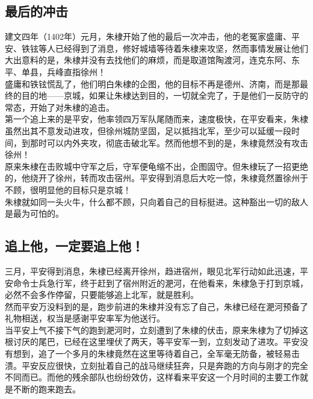 \begin{multicols}{\theparacolNo}
\subsection{最后的冲击}
建文四年（1402年）元月，朱棣开始了他的最后一次冲击，他的老冤家盛庸、平安、铁铉等人已经得到了消息，修好城墙等待着朱棣来攻坚，然而事情发展让他们大出意料的是，朱棣并没有去找他们的麻烦，而是取道馆陶渡河，连克东阿、东平、单县，兵峰直指徐州！\\

盛庸和铁铉慌乱了，他们明白朱棣的企图，他的目标不再是德州、济南，而是那最终的目的地——京城，如果让朱棣达到目的，一切就全完了，于是他们一反防守的常态，开始了对朱棣的追击。\\

第一个追上来的是平安，他率领四万军队尾随而来，速度极快，在平安看来，朱棣虽然出其不意发动进攻，但徐州城防坚固，足以抵挡北军，至少可以延缓一段时间，到那时可以内外夹攻，彻底击破北军。然而他想不到的是，朱棣竟然没有攻击徐州！\\

原来朱棣在击败城中守军之后，守军便龟缩不出，企图固守。但朱棣玩了一招更绝的，他绕开了徐州，转而攻击宿州。平安得到消息后大吃一惊，朱棣竟然置徐州于不顾，很明显他的目标只是京城！\\

朱棣就如同一头火牛，什么都不顾，只向着自己的目标挺进。这种豁出一切的敌人是最为可怕的。\\

\subsection{追上他，一定要追上他！}
三月，平安得到消息，朱棣已经离开徐州，趋进宿州，眼见北军行动如此迅速，平安命令士兵急行军，终于赶到了宿州附近的淝河，在他看来，朱棣急于打到京城，必然不会多作停留，只要能够追上北军，就是胜利。\\

然而平安万没料到的是，跑步前进的朱棣并没有忘了自己，朱棣已经在淝河预备了礼物相送，权当是感谢平安率军为他送行。\\

当平安上气不接下气的跑到淝河时，立刻遭到了朱棣的伏击，原来朱棣为了切掉这根讨厌的尾巴，已经在这里埋伏了两天，等平安军一到，立刻发动了进攻。平安没有想到，追了一个多月的朱棣竟然在这里等待着自己，全军毫无防备，被轻易击溃。平安反应很快，立刻扯着自己的战马继续狂奔，只是奔跑的方向与刚才的完全不同而已。而他的残余部队也纷纷效仿，这样看来平安这一个月时间的主要工作就是不断的跑来跑去。\\


\end{multicols}
